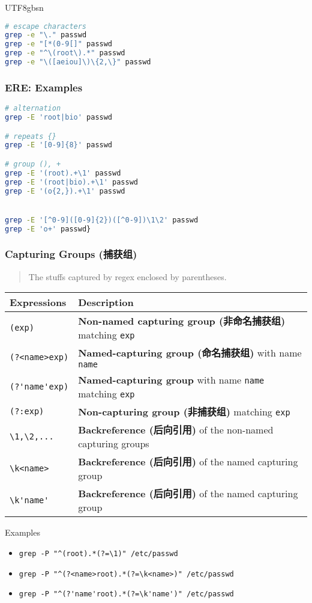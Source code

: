 \documentclass[red]{beamer}
\newcommand*{\lstverb}{\lstinline[style=caret]}
\begin{document}
\begin{CJK*}{UTF8}{gbsn}
\begin{frame}[containsverbatim]
\begin{lstlisting}[language=bash]
# escape characters
grep -e "\." passwd
grep -e "[*(0-9[]" passwd
grep -e "^\(root\).*" passwd
grep -e "\([aeiou]\)\{2,\}" passwd 
\end{lstlisting}
\end{frame}


\begin{frame}
\frametitle{ERE: Examples}
\begin{lstlisting}[language=bash]
# alternation
grep -E 'root|bio' passwd

# repeats {}
grep -E '[0-9]{8}' passwd

# group (), +
grep -E '(root).+\1' passwd
grep -E '(root|bio).+\1' passwd
grep -E '(o{2,}).+\1' passwd


grep -E '[^0-9]([0-9]{2})([^0-9])\1\2' passwd
grep -E 'o+' passwd} 
\end{lstlisting}
\end{frame}

\begin{frame}
\frametitle{Capturing Groups (捕获组)}
\begin{quote}
\footnotesize
The stuffs captured by regex enclosed by parentheses. 
\end{quote}
\begin{table}[ht]
\tiny
\renewcommand\arraystretch{1.5}
\begin{tabular}{ll}
\hline
\textbf{Expressions} & \textbf{Description}\\
\hline
\lstverb|(exp)| & \textbf{Non-named capturing group (非命名捕获组)} matching \texttt{exp}\\
\lstverb|(?<name>exp)| & \textbf{Named-capturing group (命名捕获组)} with name \texttt{name}\\
\lstverb|(?'name'exp)| & \textbf{Named-capturing group} with name \texttt{name} matching \texttt{exp}\\
\lstverb|(?:exp)| & \textbf{Non-capturing group (非捕获组)} matching \texttt{exp}\\
\lstverb|\1,\2,...| & \textbf{Backreference (后向引用)} of the non-named capturing groups\\
\lstverb|\k<name>| & \textbf{Backreference (后向引用)} of the named capturing group\\
\lstverb|\k'name'| & \textbf{Backreference (后向引用)} of the named capturing group\\
\hline
\end{tabular}
\end{table}
\begin{block}{\centering Examples}
\scriptsize
\begin{itemize}
	\item \lstverb{grep -P "^(root).*(?=\1)" /etc/passwd}
	\item \lstverb{grep -P "^(?<name>root).*(?=\k<name>)" /etc/passwd}
	\item \lstverb{grep -P "^(?'name'root).*(?=\k'name')" /etc/passwd}
\end{itemize}
\end{block}
\end{frame}



\end{CJK*}
\end{document}
